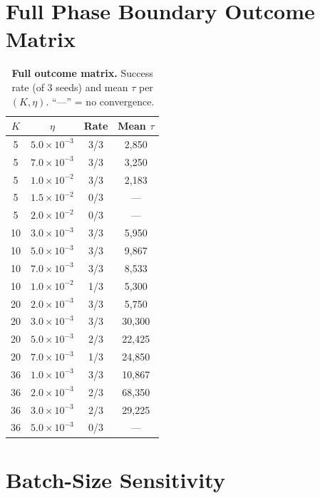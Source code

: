 \documentclass{article}
\begin{document}


\appendix
\section{Full Phase Boundary Outcome Matrix}
\label{app:matrix}

\begin{table}[h]
\centering
\caption{\textbf{Full outcome matrix.} Success rate (of 3 seeds) and mean $\tau$ per $(K, \eta)$. ``---'' = no convergence.}
\label{tab:full-matrix}
\vspace{4pt}
\small
\begin{tabular}{@{}cccc@{}}
\toprule
$K$ & $\eta$ & Rate & Mean $\tau$ \\
\midrule
5  & $5.0 \times 10^{-3}$ & 3/3 & 2{,}850 \\
5  & $7.0 \times 10^{-3}$ & 3/3 & 3{,}250 \\
5  & $1.0 \times 10^{-2}$ & 3/3 & 2{,}183 \\
5  & $1.5 \times 10^{-2}$ & 0/3 & --- \\
5  & $2.0 \times 10^{-2}$ & 0/3 & --- \\
\midrule
10 & $3.0 \times 10^{-3}$ & 3/3 & 5{,}950 \\
10 & $5.0 \times 10^{-3}$ & 3/3 & 9{,}867 \\
10 & $7.0 \times 10^{-3}$ & 3/3 & 8{,}533 \\
10 & $1.0 \times 10^{-2}$ & 1/3 & 5{,}300 \\
\midrule
20 & $2.0 \times 10^{-3}$ & 3/3 & 5{,}750 \\
20 & $3.0 \times 10^{-3}$ & 3/3 & 30{,}300 \\
20 & $5.0 \times 10^{-3}$ & 2/3 & 22{,}425 \\
20 & $7.0 \times 10^{-3}$ & 1/3 & 24{,}850 \\
\midrule
36 & $1.0 \times 10^{-3}$ & 3/3 & 10{,}867 \\
36 & $2.0 \times 10^{-3}$ & 2/3 & 68{,}350 \\
36 & $3.0 \times 10^{-3}$ & 2/3 & 29{,}225 \\
36 & $5.0 \times 10^{-3}$ & 0/3 & --- \\
\bottomrule
\end{tabular}
\end{table}

\section{Batch-Size Sensitivity}
\label{app:batchsize}
\end{document}
